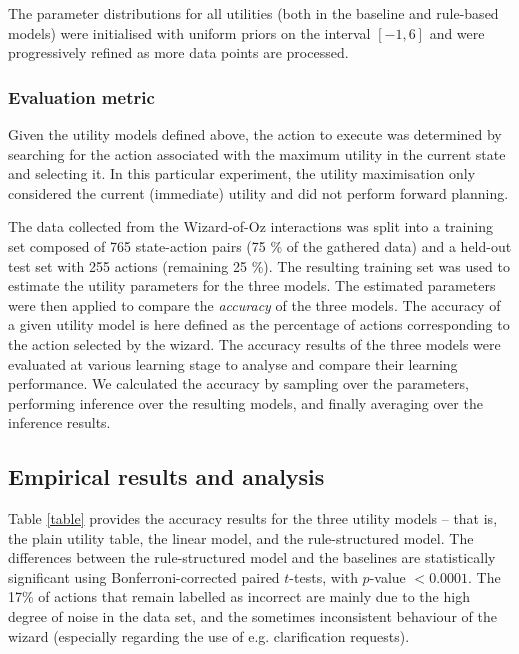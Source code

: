The parameter distributions for all utilities (both in the baseline and rule-based models) were initialised with uniform priors on the interval $[-1,6]$ and were progressively refined as more data points are processed.  

\subsubsection*{Evaluation metric}

Given the utility models defined above, the action to execute was determined by searching for the action associated with the maximum utility in the current state and selecting it. In this particular experiment, the utility maximisation only considered the current (immediate) utility and did not perform forward planning.

The data collected from the Wizard-of-Oz interactions was split into a training set composed of 765 state-action pairs (75 \% of the gathered data) and a held-out test set with 255 actions (remaining 25 \%). The resulting training set was used to estimate the utility parameters for the three models. The estimated parameters were then applied to compare the \textit{accuracy} of the three models.  The accuracy of a given utility model is here defined as the percentage of actions corresponding to the action selected by the wizard.  The accuracy results of the three models were evaluated at various learning stage to analyse and compare their learning performance. We calculated the accuracy by sampling over the parameters, performing inference over the resulting models, and finally averaging over the inference results.  

\subsection{Empirical results and analysis}
\label{sec:wozlearning-experiments-results}

Table \ref{table} provides the accuracy results for the three utility models -- that is, the plain utility table, the linear model, and the rule-structured model. The differences between the rule-structured model and the baselines are statistically significant using Bonferroni-corrected paired $t$-tests, with $p$-value $< 0.0001$.  The 17\% of actions that remain labelled as incorrect are mainly due to the high degree of noise in the data set, and the sometimes inconsistent behaviour of the wizard (especially regarding the use of e.g. clarification requests). 

